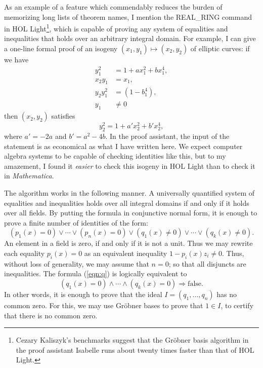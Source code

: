 \documentclass{llncs}
\begin{document}
As an example of a feature which commendably reduces the burden of
memorizing long lists of theorem names, I mention the {REAL\_RING} command in
HOL Light\footnote{
  Cezary Kaliszyk's benchmarks suggest that the Gr\"obner basis algorithm in 
the proof assistant Isabelle
  runs about twenty times faster than that of HOL Light.
}, 
which is capable of proving any system of equalities and
inequalities that holds over an arbitrary integral domain.  For
example, I can give a one-line formal proof of an isogeny $(x_1,y_1)
\mapsto (x_2,y_2)$ of elliptic curves: if we have
\begin{align*}
y_1^2 &= 1 + a x_1^2 + b x_1^4,\\
x_2 y_1&=x_1,\\
y_2 y_1^2&=(1 - b_1^4),\\
y_1&\ne 0
\end{align*}
then $(x_2,y_2)$ satisfies
\[
y_2^2 = 1 + a' x_2^2 + b' x_2^4,
\]
where $a' = -2a$ and $b' = a^2 - 4b$.  In the proof assistant, 
the input of the
statement is as economical as what I have written here. We expect computer
algebra systems to be capable of checking identities like this, but to
my amazement, I found it {\it easier} to check this isogeny in HOL
Light than to check it in {\it Mathematica}.

The algorithm works in the following manner.  A universally
quantified system of equalities and inequalities holds over all integral
domains if and only if it holds over all fields.  
By putting the formula
in conjunctive normal form, it is enough to prove a finite number of
identities of the form:
\begin{equation}\label{eqn:q}
(p_1(x)=0) \lor \cdots \lor (p_n(x)=0) \lor (q_1(x)\ne 0) \lor\cdots\lor (q_k(x)\ne 0).
\end{equation}
An element in a field is zero, if and only if it is not a unit.  Thus we may
rewrite each equality $p_i(x)=0$ as an equivalent inequality $1-p_i(x)z_i\ne 0$.
Thus, without loss of generality, we may assume that $n=0$; so that all disjuncts
are inequalities.  The formula (\ref{eqn:q}) is logically equivalent to
\[
(q_1(x) =0) \land \cdots \land (q_k(x) = 0) \Longrightarrow \text{false}.
\]
In other words, it is enough to prove that 
the ideal $I=(q_1,\ldots,q_n)$ has no common zero.  For this,
we may use Gr\"obner bases  to prove that $1\in I$, to certify that
there is no common zero.  
\end{document}
